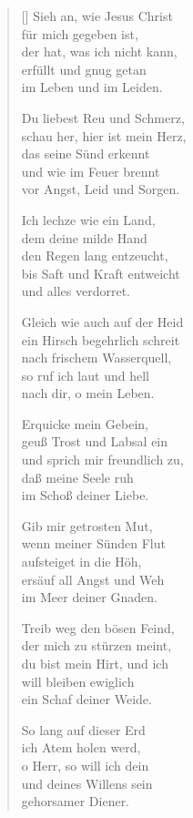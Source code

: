 \begin{multicols}{2}
\begin{verse}[\versewidth]
 Sieh an, wie Jesus Christ\\
für mich gegeben ist,\\
der hat, was ich nicht kann,\\
erfüllt und gnug getan\\
im Leben und im Leiden.

 Du liebest Reu und Schmerz,\\
schau her, hier ist mein Herz,\\
das seine Sünd erkennt\\
und wie im Feuer brennt\\
vor Angst, Leid und Sorgen.

 Ich lechze wie ein Land,\\
dem deine milde Hand\\
den Regen lang entzeucht,\\
bis Saft und Kraft entweicht\\
und alles verdorret.

 Gleich wie auch auf der Heid\\
ein Hirsch begehrlich schreit\\
nach frischem Wasserquell,\\
so ruf ich laut und hell\\
nach dir, o mein Leben.

 Erquicke mein Gebein,\\
geuß Trost und Labsal ein\\
und sprich mir freundlich zu,\\
daß meine Seele ruh\\
im Schoß deiner Liebe.

 Gib mir getrosten Mut,\\
wenn meiner Sünden Flut\\
aufsteiget in die Höh,\\
ersäuf all Angst und Weh\\
im Meer deiner Gnaden.

 Treib weg den bösen Feind,\\
der mich zu stürzen meint,\\
du bist mein Hirt, und ich\\
will bleiben ewiglich\\
ein Schaf deiner Weide.

 So lang auf dieser Erd\\
ich Atem holen werd,\\
o Herr, so will ich dein\\
und deines Willens sein\\
gehorsamer Diener.


\end{verse}
\end{multicols}
